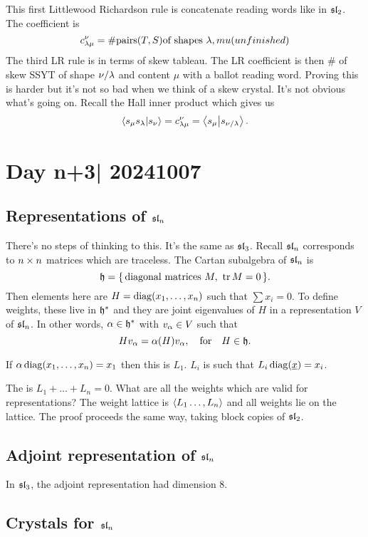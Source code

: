 \documentclass[12pt]{memoir}
\begin{document}
This first Littlewood Richardson rule is concatenate reading words like in $\mathfrak{sl}_2$. The coefficient is 
$$c_{\lambda\mu}^\nu=\# \text{pairs} (T,S) \text{of shapes }\lambda,mu(unfinished)$$
The third LR rule is in terms of skew tableau. The LR coefficient is then $\#$ of skew SSYT of shape $\nu/\lambda$ and content $\mu$ with a ballot reading word. Proving this is harder but it's not so bad when we think of a skew crystal. It's not obvious what's going on. Recall the Hall inner product which gives us 
$$\braket{s_\mu s_\lambda}{s_\nu}=c_{\lambda\mu}^\nu=\braket{s_\mu}{s_{\nu/\lambda}}.$$

\section{Day n+3| 20241007}

\subsection{Representations of $\mathfrak{sl}_n$}

There's no steps of thinking to this. It's the same as $\mathfrak{sl}_3$. Recall $\mathfrak{sl}_n$ corresponds to $n\times n$ matrices which are traceless. The Cartan subalgebra of $\mathfrak{sl}_n$ is 
$$\mathfrak{h}=\{\,\text{diagonal matrices }M,\ \tr M=0\,\}.$$
Then elements here are $H=\operatorname{diag}(x_1,\dots,x_n)$ such that $\sum x_i=0$. To define weights, these live in $\mathfrak{h}^\ast$ and they are joint eigenvalues of $H$ in a representation $V$ of $\mathfrak{sl}_n$. In other words, $\alpha\in\mathfrak{h}^\ast$ with $v_\alpha\in V$ such that 
$$Hv_\alpha=\alpha(H)v_\alpha,\quad\text{for}\quad H\in\mathfrak{h}.$$

\begin{Ex}
    If $\alpha\operatorname{diag}(x_1,\dots,x_n)=x_1$ then this is $L_1$. $L_i$ is such that $L_i\operatorname{diag}(\underline x)=x_i$.
\end{Ex}

The  is $L_1+\dots+L_n=0$. What are all the weights which are valid for representations? The weight lattice is $\left\langle L_1\dots,L_n\right\rangle$ and all weights lie on the lattice. The proof proceeds the same way, taking block copies of $\mathfrak{sl}_2$.

\subsection{Adjoint representation of $\mathfrak{sl}_n$}

In $\mathfrak{sl}_3$, the adjoint representation had dimension 8.  

\subsection{Crystals for $\mathfrak{sl}_n$}
\end{document}
